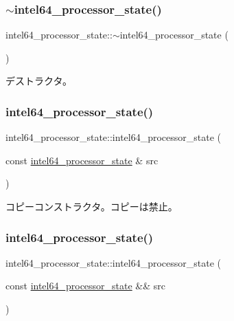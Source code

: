 \subsubsection{\texorpdfstring{$\sim$intel64\+\_\+processor\+\_\+state()}{~intel64\_processor\_state()}}
{\footnotesize\ttfamily intel64\+\_\+processor\+\_\+state\+::$\sim$intel64\+\_\+processor\+\_\+state (\begin{DoxyParamCaption}{ }\end{DoxyParamCaption})\hspace{0.3cm}{\ttfamily [virtual]}}

デストラクタ。 \hypertarget{classintel64__processor__state_a3738e66d78d9a28faf9ac8add8f350ac}{}\label{classintel64__processor__state_a3738e66d78d9a28faf9ac8add8f350ac} 
\subsubsection{\texorpdfstring{intel64\+\_\+processor\+\_\+state()}{intel64\_processor\_state()}\hspace{0.1cm}{\footnotesize\ttfamily [2/3]}}
{\footnotesize\ttfamily intel64\+\_\+processor\+\_\+state\+::intel64\+\_\+processor\+\_\+state (\begin{DoxyParamCaption}\item[{const \hyperlink{classintel64__processor__state}{intel64\+\_\+processor\+\_\+state} \&}]{src }\end{DoxyParamCaption})\hspace{0.3cm}{\ttfamily [delete]}}

コピーコンストラクタ。コピーは禁止。 \hypertarget{classintel64__processor__state_a963f64f0971ddae9de69ab273afef1d0}{}\label{classintel64__processor__state_a963f64f0971ddae9de69ab273afef1d0} 
\subsubsection{\texorpdfstring{intel64\+\_\+processor\+\_\+state()}{intel64\_processor\_state()}\hspace{0.1cm}{\footnotesize\ttfamily [3/3]}}
{\footnotesize\ttfamily intel64\+\_\+processor\+\_\+state\+::intel64\+\_\+processor\+\_\+state (\begin{DoxyParamCaption}\item[{const \hyperlink{classintel64__processor__state}{intel64\+\_\+processor\+\_\+state} \&\&}]{src }\end{DoxyParamCaption})\hspace{0.3cm}{\ttfamily [delete]}}

